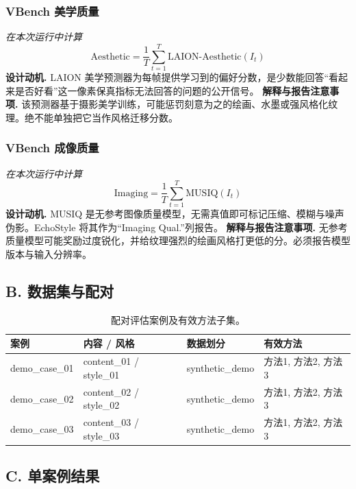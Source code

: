 \documentclass[UTF8,10pt]{ctexart}
\begin{document}
\subsubsection*{VBench 美学质量}
\textit{在本次运行中计算}
\begin{equation*}
\mathrm{Aesthetic}=\frac{1}{T}\sum_{t=1}^{T}\mathrm{LAION\text{-}Aesthetic}(I_t)
\end{equation*}
\textbf{设计动机.} LAION 美学预测器为每帧提供学习到的偏好分数，是少数能回答“看起来是否好看”这一像素保真指标无法回答的问题的公开信号。
\textbf{解释与报告注意事项.} 该预测器基于摄影美学训练，可能惩罚刻意为之的绘画、水墨或强风格化纹理。绝不能单独把它当作风格迁移分数。
\subsubsection*{VBench 成像质量}
\textit{在本次运行中计算}
\begin{equation*}
\mathrm{Imaging}=\frac{1}{T}\sum_{t=1}^{T}\mathrm{MUSIQ}(I_t)
\end{equation*}
\textbf{设计动机.} MUSIQ 是无参考图像质量模型，无需真值即可标记压缩、模糊与噪声伪影。EchoStyle 将其作为“Imaging Qual.”列报告。
\textbf{解释与报告注意事项.} 无参考质量模型可能奖励过度锐化，并给纹理强烈的绘画风格打更低的分。必须报告模型版本与输入分辨率。
\subsection*{B. 数据集与配对}
\begin{table}[H]
\centering
\caption{配对评估案例及有效方法子集。}
\label{tab:dataset}
\small
\begin{tabularx}{\linewidth}{@{}lXlX@{}}
\toprule
案例 & 内容 / 风格 & 数据划分 & 有效方法 \\
\midrule
demo\_case\_01 & content\_01 / style\_01 & synthetic\_demo & 方法1, 方法2, 方法3 \\
demo\_case\_02 & content\_02 / style\_02 & synthetic\_demo & 方法1, 方法2, 方法3 \\
demo\_case\_03 & content\_03 / style\_03 & synthetic\_demo & 方法1, 方法2, 方法3 \\
\bottomrule
\end{tabularx}
\end{table}
\subsection*{C. 单案例结果}
\end{document}
